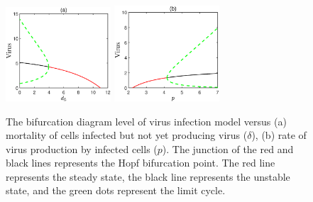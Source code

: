 \documentclass{CMHPhD-SIVD}
\begin{document}
\begin{figure}[h!]
\centering
\includegraphics[height=0.20\textheight,width=0.35\textwidth]{A4.eps}
\includegraphics[height=0.20\textheight,width=0.35\textwidth]{A5.eps}
\vspace{3mm}
\caption{The bifurcation diagram level of virus infection model versus (a) mortality of cells infected but not yet producing virus ($\delta$), (b) rate of virus production by infected cells ($p$). The junction of the red and black lines represents the Hopf bifurcation point. The red line represents the steady state, the black line represents the unstable state, and the green dots represent the limit cycle.}
\label{Fig.6}
\end{figure}
\end{document}
